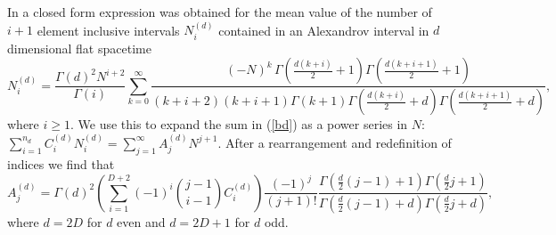 \documentclass[12pt]{article}
\begin{document}
In \cite{Glaser_Sumati:Locality_in_Causal_Set} a closed form expression was obtained for the mean value of the number of $i+1$ element inclusive intervals $N_i^{(d)}$ contained in an Alexandrov interval in $d$ dimensional flat spacetime 
\begin{equation} N_i^{ (d)}= \frac{\Gamma\left (d\right)^2 N^{i+2}}{\Gamma\left (i\right)} \sum_{k=0}^\infty \frac{ (-N)^k\,\Gamma\left (\frac{d (k+i)}{2}+1\right)  \Gamma\left (\frac{d (k+i+1)}{2}+1\right)}{ (k+i+2)  (k+i+1) \Gamma\left (k+1\right)\Gamma\left (\frac{d (k+i)}{2} +d\right) \Gamma\left (\frac{d (k+i+1)}{2}+d\right)},\nonumber
\end{equation} 
where $i \geq 1$.  We use this to expand the sum in (\ref{bd}) as a power series in $N$: $\sum_{i=1}^{n_d}C_i^{ (d)} N_i^{ (d)} = \sum_{j=1}^\infty A_j^{ (d)}  N^{j+1}$.  After a rearrangement and redefinition of indices we find that 
\begin{equation}
 A_j^{ (d)} = \Gamma\left (d\right)^2\left ( \sum_{i=1}^{D+2} (-1)^i \binom{j-1}{i-1}  C_i^{ (d)}  \right) \frac{ (-1)^j}{ (j+1)!}\frac{\Gamma\left (\frac{d}{2} (j-1)+1\right)\Gamma\left (\frac{d}{2}j+1\right)}{\Gamma\left (\frac{d}{2} (j-1)+d\right) \Gamma\left (\frac{d}{2}j+d\right)}, 
\end{equation} 
where $d=2D$ for $d$ even and $d=2D+1$ for $d$ odd.   
\end{document}
